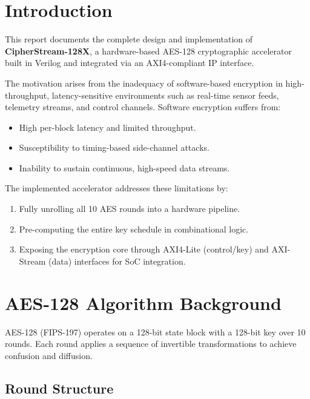 \documentclass[12pt,a4paper]{article}
\begin{document}
\section{Introduction}

This report documents the complete design and implementation of
\textbf{CipherStream-128X}, a hardware-based AES-128 cryptographic accelerator
built in Verilog and integrated via an AXI4-compliant IP interface.

The motivation arises from the inadequacy of software-based encryption in
high-throughput, latency-sensitive environments such as real-time sensor feeds,
telemetry streams, and control channels. Software encryption suffers from:
\begin{itemize}[nosep]
  \item High per-block latency and limited throughput.
  \item Susceptibility to timing-based side-channel attacks.
  \item Inability to sustain continuous, high-speed data streams.
\end{itemize}

The implemented accelerator addresses these limitations by:
\begin{enumerate}[nosep]
  \item Fully unrolling all 10 AES rounds into a hardware pipeline.
  \item Pre-computing the entire key schedule in combinational logic.
  \item Exposing the encryption core through AXI4-Lite (control/key) and
        AXI-Stream (data) interfaces for SoC integration.
\end{enumerate}

\section{AES-128 Algorithm Background}

AES-128 (FIPS-197) operates on a 128-bit state block with a 128-bit key over
10 rounds. Each round applies a sequence of invertible transformations to
achieve confusion and diffusion.

\subsection{Round Structure}
\end{document}
